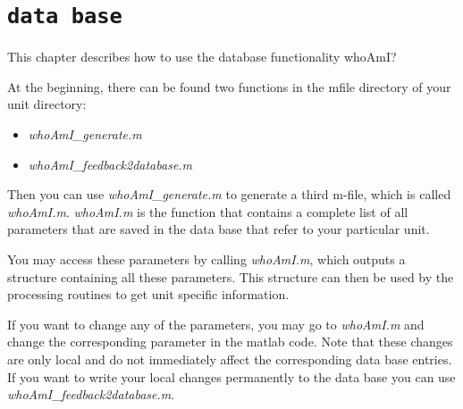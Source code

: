 \chapter{\texttt{data base}}
This chapter describes how to use the database functionality whoAmI?

At the beginning, there can be found two functions in the mfile directory of your unit directory:
\begin{itemize}
   \item \textit{whoAmI\_generate.m}
   \item \textit{whoAmI\_feedback2database.m}
\end{itemize}
Then you can use \textit{whoAmI\_generate.m} to generate a third m-file, which
is called \textit{whoAmI.m}.  \textit{whoAmI.m} is the function that contains
a complete list of all parameters that are saved in the data base that refer to
your particular unit. 

You may access these parameters by calling \textit{whoAmI.m}, which outputs
a structure containing all these parameters.  This structure can then be used
by the processing routines to get unit specific information.

If you want to change any of the parameters, you may go to \textit{whoAmI.m} and
change the corresponding parameter in the matlab code. Note that these changes are only 
local and do not immediately affect the corresponding data base entries. 
If you want to write your local changes permanently to the data base you can use
\textit{whoAmI\_feedback2database.m}. 



